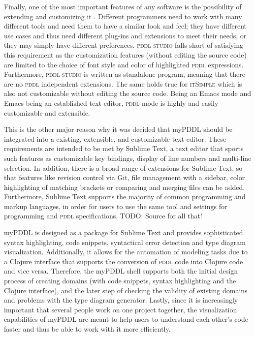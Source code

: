 \documentclass[a4paper,12pt]{report}
\newcommand{\mypddl}{\smallerft[0.8]{myPDDL}\xspace}
\newcommand{\pddlstudio}{\textsc{pddl studio}\xspace}
\newcommand{\itsimple}{\textsc{itSimple}\xspace}
\newcommand{\pddlmode}{\textsc{pddl}-mode\xspace}
\newcommand{\pddl}{\textsc{pddl}\xspace}
\newcommand\smallerft[2][0.85]{{\scalefont{#1}#2}}
\begin{document}
Finally, one of the most important features of any software is the
possibility of extending and customizing it
\cite{hui2003requirements}. Different programmers need to work with
many different tools and need them to have a similar look and feel;
they have different use cases and thus need different plug-ins and
extensions to meet their needs, or they may simply have different
preferences. \pddlstudio falls short of satisfying this requirement as
the customization features (without editing the source code) are
limited to the choice of font style and color of highlighted \pddl
expressions. Furthermore, \pddlstudio is written as standalone
program, meaning that there are no \pddl independent extensions. The
same holds true for \itsimple which is also not customizable without
editing the source code. Being an Emacs mode and Emacs being an
established text editor, \pddlmode is highly and easily customizable
and extensible.

This is the other major reason why it was decided that \mypddl should
be integrated into a existing, extensible, and customizable text
editor. These requirements are intended to be met by Sublime Text, a
text editor that sports such features as customizable key bindings,
display of line numbers and multi-line selection. In addition, there
is a broad range of extensions for Sublime Text, so that features like
revision control via Git, file management with a sidebar, color
highlighting of matching brackets or comparing and merging files can
be added. Furthermore, Sublime Text supports the majority of common
programming and markup languages, in order for users to use the same
tool and settings for programming and \pddl specifications. TODO:
Source for all that!

\mypddl is designed as a package for Sublime Text and provides
sophisticated syntax highlighting, code snippets, syntactical error
detection and type diagram visualization. Additionally, it allows for
the automation of modeling tasks due to a Clojure interface that
supports the conversion of \textsc{pddl} code into Clojure code and
vice versa. Therefore, the \mypddl shell supports both the initial
design process of creating domains (with code snippets, syntax
highlighting and the Clojure interface), and the later step of
checking the validity of existing domains and problems with the type
diagram generator. Lastly, since it is increasingly important that
several people work on one project together, the visualization
capabilities of \mypddl are meant to help users to understand each
other's code faster and thus be able to work with it more efficiently.
\end{document}
